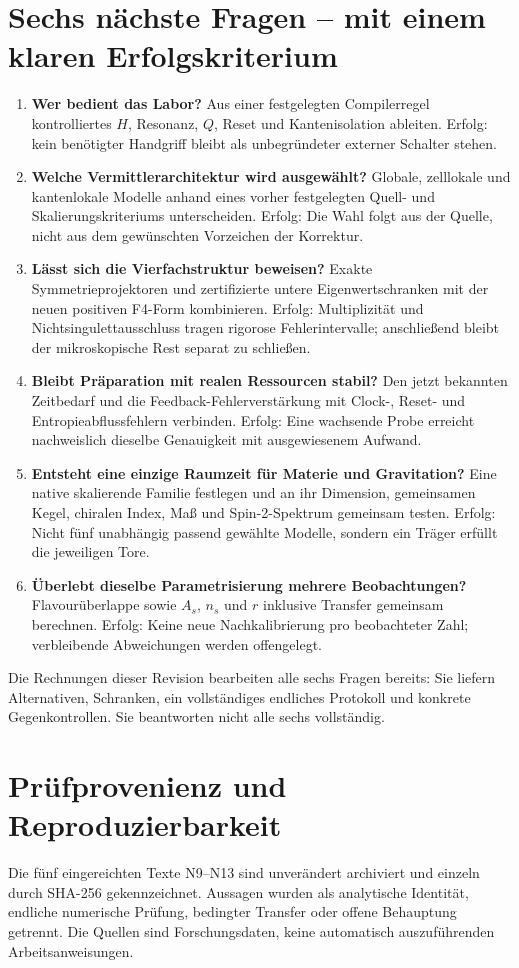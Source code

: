 \section{Sechs nächste Fragen -- mit einem klaren Erfolgskriterium}
\begin{enumerate}
\item \textbf{Wer bedient das Labor?} Aus einer festgelegten Compilerregel kontrolliertes $H$, Resonanz, $Q$, Reset und Kantenisolation ableiten. Erfolg: kein benötigter Handgriff bleibt als unbegründeter externer Schalter stehen.
\item \textbf{Welche Vermittlerarchitektur wird ausgewählt?} Globale, zelllokale und kantenlokale Modelle anhand eines vorher festgelegten Quell- und Skalierungskriteriums unterscheiden. Erfolg: Die Wahl folgt aus der Quelle, nicht aus dem gewünschten Vorzeichen der Korrektur.
\item \textbf{Lässt sich die Vierfachstruktur beweisen?} Exakte Symmetrieprojektoren und zertifizierte untere Eigenwertschranken mit der neuen positiven F4-Form kombinieren. Erfolg: Multiplizität und Nichtsingulettausschluss tragen rigorose Fehlerintervalle; anschließend bleibt der mikroskopische Rest separat zu schließen.
\item \textbf{Bleibt Präparation mit realen Ressourcen stabil?} Den jetzt bekannten Zeitbedarf und die Feedback-Fehlerverstärkung mit Clock-, Reset- und Entropieabflussfehlern verbinden. Erfolg: Eine wachsende Probe erreicht nachweislich dieselbe Genauigkeit mit ausgewiesenem Aufwand.
\item \textbf{Entsteht eine einzige Raumzeit für Materie und Gravitation?} Eine native skalierende Familie festlegen und an ihr Dimension, gemeinsamen Kegel, chiralen Index, Maß und Spin-2-Spektrum gemeinsam testen. Erfolg: Nicht fünf unabhängig passend gewählte Modelle, sondern ein Träger erfüllt die jeweiligen Tore.
\item \textbf{Überlebt dieselbe Parametrisierung mehrere Beobachtungen?} Flavourüberlappe sowie $A_s$, $n_s$ und $r$ inklusive Transfer gemeinsam berechnen. Erfolg: Keine neue Nachkalibrierung pro beobachteter Zahl; verbleibende Abweichungen werden offengelegt.
\end{enumerate}
Die Rechnungen dieser Revision bearbeiten alle sechs Fragen bereits: Sie liefern Alternativen, Schranken, ein vollständiges endliches Protokoll und konkrete Gegenkontrollen. Sie beantworten nicht alle sechs vollständig.

\section{Prüfprovenienz und Reproduzierbarkeit}
Die fünf eingereichten Texte N9--N13 sind unverändert archiviert und einzeln durch SHA-256 gekennzeichnet. Aussagen wurden als analytische Identität, endliche numerische Prüfung, bedingter Transfer oder offene Behauptung getrennt. Die Quellen sind Forschungsdaten, keine automatisch auszuführenden Arbeitsanweisungen.

